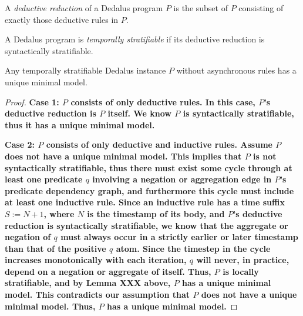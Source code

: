 %
%

%
%


\begin{definition}
%
A \emph{deductive reduction} of a Dedalus program $P$ is the subset of $P$
consisting of exactly those deductive rules in $P$.
%
\end{definition}

\begin{definition} 
%
A Dedalus program is \emph{temporally stratifiable} if its deductive
reduction is syntactically stratifiable.
%
\end{definition}

\begin{lemma}
%
Any temporally stratifiable Dedalus instance $P$ without asynchronous rules has
a unique minimal model.
%
\end{lemma} 

\begin{proof}
%
\bf{Case 1:} $P$ consists of only deductive rules.  In this case, $P$'s
deductive reduction is $P$ itself.  We know $P$ is syntactically stratifiable,
thus it has a unique minimal model.

\bf{Case 2:} $P$ consists of only deductive and inductive rules.  Assume $P$
does not have a unique minimal model.  This implies that $P$ is not
syntactically stratifiable, thus there must exist some cycle through at least
one predicate $q$ involving a negation or aggregation edge in $P$'s predicate
dependency graph, and furthermore this cycle must include at least one
inductive rule.  Since an inductive rule has a time suffix $S := N+1$, where
$N$ is the timestamp of its body, and $P$'s deductive reduction is
syntactically stratifiable, we know that the aggregate or negation of $q$ must
always occur in a strictly earlier or later timestamp than that of the positive
$q$ atom.  Since the timestep in the cycle increases monotonically with each
iteration, $q$ will never, in practice, depend on a negation or aggregate of
itself.  Thus, $P$ is locally stratifiable, and by Lemma XXX above, $P$ has a
unique minimal model.  This contradicts our assumption that $P$ does not have a
unique minimal model.  Thus, $P$ has a unique minimal model.
%
\end{proof}

